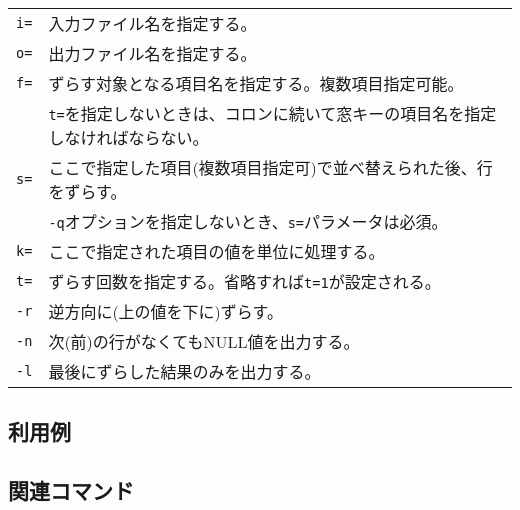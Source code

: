 \begin{table}[htbp]
{\small
\begin{tabular}{ll}
\verb|i=|    & 入力ファイル名を指定する。\\
\verb|o=|    & 出力ファイル名を指定する。\\ 
\verb|f=|    & ずらす対象となる項目名を指定する。複数項目指定可能。 \\
             & \verb|t=|を指定しないときは、コロンに続いて窓キーの項目名を指定しなければならない。\\
\verb|s=|    & ここで指定した項目(複数項目指定可)で並べ替えられた後、行をずらす。 \\
             & \verb|-q|オプションを指定しないとき、\verb|s=|パラメータは必須。\\
\verb|k=|    & ここで指定された項目の値を単位に処理する。\\
\verb|t=|    & ずらす回数を指定する。省略すれば\verb|t=1|が設定される。 \\
\verb|-r|    & 逆方向に(上の値を下に)ずらす。\\
\verb|-n|    & 次(前)の行がなくてもNULL値を出力する。\\
\verb|-l|    & 最後にずらした結果のみを出力する。\\
\end{tabular} 
}
\end{table} 

\subsection*{利用例}

\subsection*{関連コマンド}

%
